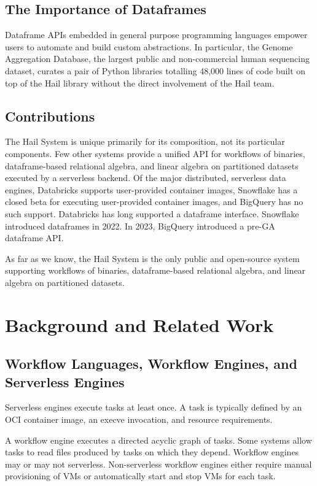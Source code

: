 \documentclass[10pt,a4paper%
]{article}
\begin{document}
\subsection{The Importance of Dataframes}

Dataframe APIs embedded in general purpose programming languages empower users to automate and build
custom abstractions. In particular, the Genome Aggregation Database, the largest public and
non-commercial human sequencing dataset, curates a pair of Python libraries totalling 48,000 lines
of code built on top of the Hail library without the direct involvement of the Hail team.

\subsection{Contributions}

The Hail System is unique primarily for its composition, not its particular components. Few other
systems provide a unified API for workflows of binaries, dataframe-based relational algebra, and
linear algebra on partitioned datasets executed by a serverless backend. Of the major distributed,
serverless data engines, Databricks supports user-provided container images, Snowflake has a closed
beta for executing user-provided container images, and BigQuery has no such support. Databricks has
long supported a dataframe interface. Snowflake introduced dataframes in 2022. In 2023, BigQuery
introduced a pre-GA dataframe API.

As far as we know, the Hail System is the only public and open-source system supporting workflows of
binaries, dataframe-based relational algebra, and linear algebra on partitioned datasets.

\section{Background and Related Work}

\subsection{Workflow Languages, Workflow Engines, and Serverless Engines}

Serverless engines execute tasks at least once. A task is typically defined by an OCI container
image, an execve invocation, and resource requirements.

A workflow engine executes a directed acyclic graph of tasks. Some systems allow tasks to read files
produced by tasks on which they depend. Workflow engines may or may not serverless. Non-serverless
workflow engines either require manual provisioning of VMs or automatically start and stop VMs for
each task.
\end{document}
